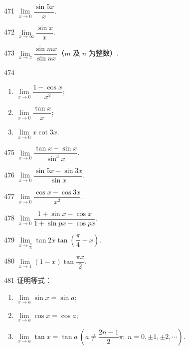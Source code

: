 
\begin{prob}[S]{471}
$\lim\limits_{x \to 0} \dfrac{\sin 5x}{x}$.
\end{prob}

\begin{prob}[S]{472}
$\lim\limits_{x \to \infty} \dfrac{\sin x}{x}$.
\end{prob}

\begin{prob}[S]{473}
$\lim\limits_{x \to \pi} \dfrac{\sin mx}{\sin nx}$（$m$ 及 $n$ 为整数）.
\end{prob}

\begin{prob}[L]{474}
\begin{enumerate}[label=(\alph*), itemsep=2pt, topsep=3pt]
  \item $\lim\limits_{x \to 0} \dfrac{1 - \cos x}{x^2}$;
  \item $\lim\limits_{x \to 0} \dfrac{\tan x}{x}$;
  \item $\lim\limits_{x \to 0} x \cot 3x$.
\end{enumerate}
\end{prob}

\begin{prob}[S]{475}
$\lim\limits_{x \to 0} \dfrac{\tan x - \sin x}{\sin^3 x}$.
\end{prob}

\begin{prob}[S]{476}
$\lim\limits_{x \to 0} \dfrac{\sin 5x - \sin 3x}{\sin x}$.
\end{prob}

\begin{prob}[S]{477}
$\lim\limits_{x \to 0} \dfrac{\cos x - \cos 3x}{x^2}$.
\end{prob}

\begin{prob}[S]{478}
$\lim\limits_{x \to 0} \dfrac{1 + \sin x - \cos x}{1 + \sin px - \cos px}$.
\end{prob}

\begin{prob}[S]{479}
$\lim\limits_{x \to \frac{\pi}{4}} \tan 2x \tan\left(\dfrac{\pi}{4} - x\right)$.
\end{prob}

\begin{prob}[S]{480}
$\lim\limits_{x \to 1} (1 - x) \tan \dfrac{\pi x}{2}$.
\end{prob}

\begin{prob}[L]{481}
证明等式：
\begin{enumerate}[label=(\alph*), itemsep=2pt, topsep=3pt]
  \item $\lim\limits_{x \to a} \sin x = \sin a$;
  \item $\lim\limits_{x \to a} \cos x = \cos a$;
  \item $\lim\limits_{x \to a} \tan x = \tan a\ \left(a \neq \dfrac{2n - 1}{2}\pi;\ n = 0, \pm 1, \pm 2, \cdots\right)$.
\end{enumerate}
\end{prob}

